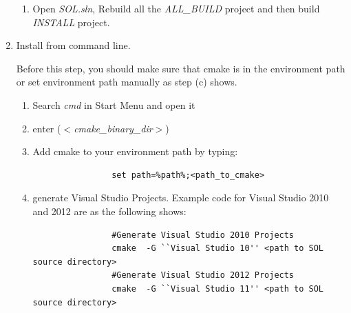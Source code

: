 \documentclass[11pt,a4paper]{article}
\newlength{\wideitemsep}
\let\olditem\item
\renewcommand{\item}{\setlength{\itemsep}{\wideitemsep}\olditem}
\begin{document}
\begin{enumerate}
\begin{enumerate}
            \item Open \emph{SOL.sln}, Rebuild all the \emph{ALL\_BUILD} project
                and then build \emph{INSTALL} project.
                \begin{figure}[!h]
                    \centering
                    \label{fig:build}
                \end{figure}

        \end{enumerate}

    \item Install from command line. 
        
        Before this step, you should make sure that cmake is in the environment path or set environment path manually
        as step (c) shows.
        \begin{enumerate}
            \item Search \emph{cmd} in {Start Menu} and open it
            \item enter ($<$\emph{cmake\_binary\_dir}$>$)
            \item Add cmake to your environment path by typing:
                \lstset{language=bash,
                    framexleftmargin=-3cm,
                    xleftmargin=-3cm,
                }
                \begin{lstlisting}
                set path=%path%;<path_to_cmake>
                \end{lstlisting}
            \item generate Visual Studio Projects. Example code for Visual Studio
                2010 and 2012 are as the following shows:
                \lstset{language=bash,
                }
                \begin{lstlisting}
                #Generate Visual Studio 2010 Projects
                cmake  -G ``Visual Studio 10'' <path to SOL source directory>
                #Generate Visual Studio 2012 Projects
                cmake  -G ``Visual Studio 11'' <path to SOL source directory>
                \end{lstlisting}


\end{enumerate}
\end{enumerate}
\end{document}
